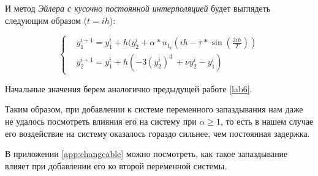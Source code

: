 И метод \textit{Эйлера с кусочно постоянной интерполяцией}
будет выглядеть следующим образом ($t = ih$):

\begin{equation}\label{lab7:euler}
  \begin{cases}
  &y_1^{i+1} = y_1^i + h(y_2^i + \alpha * u_{1_t}(ih-\tau*\sin(\frac{2ih}{T}))\\
  &y_2^{i+1} = y_1^i + h(-3(y_2^i)^3\ + \nu y_2^i - y_1^i)
  \end{cases}
\end{equation}

Начальные значения берем аналогично предыдущей работе \ref{lab6}.

\clearpage

Таким образом, при добавлении к системе переменного запаздывания
нам даже не удалось посмотреть влияния его на систему при
$\alpha \geq 1$, то есть в нашем случае его воздействие на
систему оказалось гораздо сильнее, чем постоянная задержка.

В приложении \ref{app:changeable} можно посмотреть, как
такое запаздывание влияет при добавлении его ко второй
переменной системы.
